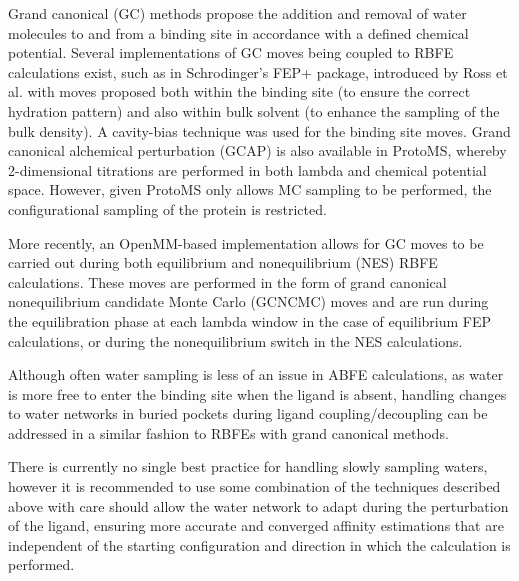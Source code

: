 \documentclass[9pt,bestpractices]{livecoms}
\begin{document}
Grand canonical (GC) methods propose the addition and removal of water molecules to and from a binding site in accordance with a defined chemical potential. Several implementations of GC moves being coupled to RBFE calculations exist, such as in Schrodinger's FEP+ package, introduced by Ross et al.\cite{ross2020enhancing} with moves proposed both within the binding site (to ensure the correct hydration pattern) and also within bulk solvent (to enhance the sampling of the bulk density). A cavity-bias technique was used for the binding site moves. Grand canonical alchemical perturbation (GCAP)\cite{brucemacdonald2018ligand} is also available in ProtoMS\cite{woods2018protoms}, whereby 2-dimensional titrations are performed in both lambda and chemical potential space. However, given ProtoMS only allows MC sampling to be performed, the configurational sampling of the protein is restricted.

More recently, an OpenMM-based implementation allows for GC moves to be carried out during both equilibrium and nonequilibrium (NES) RBFE calculations\cite{melling2025developing}. These moves are performed in the form of grand canonical nonequilibrium candidate Monte Carlo (GCNCMC) moves\cite{melling2023enhanced} and are run during the equilibration phase at each lambda window in the case of equilibrium FEP calculations, or during the nonequilibrium switch in the NES calculations.

Although often water sampling is less of an issue in ABFE calculations, as water is more free to enter the binding site when the ligand is absent, handling changes to water networks in buried pockets during ligand coupling/decoupling can be addressed in a similar fashion to RBFEs with grand canonical methods.


There is currently no single best practice for handling slowly sampling waters, however it is recommended to use some combination of the techniques described above with care should allow the water network to adapt during the perturbation of the ligand, ensuring more accurate and converged affinity estimations that are independent of the starting configuration and direction in which the calculation is performed.
\end{document}
